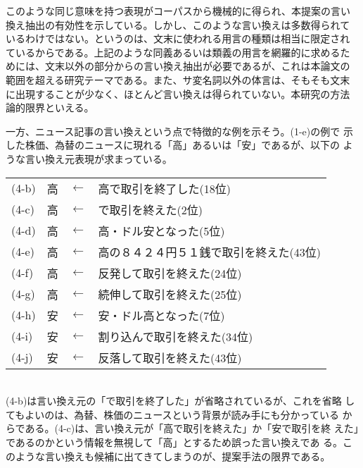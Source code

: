 \documentclass[jnlpbbl]{jnlp_j}
\begin{document}
このような同じ意味を持つ表現がコーパスから機械的に得られ、本提案の言い
換え抽出の有効性を示している。しかし、このような言い換えは多数得られて
いるわけではない。というのは、文末に使われる用言の種類は相当に限定され
ているからである。上記のような同義あるいは類義の用言を網羅的に求めるた
めには、文末以外の部分からの言い換え抽出が必要であるが、これは本論文の
範囲を超える研究テーマである。また、サ変名詞以外の体言は、そもそも文末
に出現することが少なく、ほとんど言い換えは得られていない。本研究の方法
論的限界といえる。

一方、ニュース記事の言い換えという点で特徴的な例を示そう。(1-e)の例で
示した株価、為替のニュースに現れる「高」あるいは「安」であるが、以下の
ような言い換え元表現が求まっている。
\\

\begin{tabular}{llcl}
(4-b) & 高  & $\leftarrow$ &  高で取引を終了した(18位) \\
(4-c) & 高  & $\leftarrow$ &  で取引を終えた(2位) \\
(4-d) & 高  & $\leftarrow$ &  高・ドル安となった(5位) \\ 
(4-e) & 高  & $\leftarrow$ &  高の８４２４円５１銭で取引を終えた(43位) \\
(4-f) & 高  & $\leftarrow$ &  反発して取引を終えた(24位) \\
(4-g) & 高  & $\leftarrow$ &  続伸して取引を終えた(25位) \\
(4-h) & 安  & $\leftarrow$ &   安・ドル高となった(7位) \\
(4-i) & 安  & $\leftarrow$ &   割り込んで取引を終えた(34位) \\
(4-j) & 安  & $\leftarrow$ &   反落して取引を終えた(43位)
\end{tabular}
\\

(4-b)は言い換え元の「で取引を終了した」が省略されているが、これを省略
してもよいのは、為替、株価のニュースという背景が読み手にも分かっている
からである。(4-c)は、言い換え元が「高で取引を終えた」か「安で取引を終
えた」であるのかという情報を無視して「高」とするため誤った言い換えであ
る。このような言い換えも候補に出てきてしまうのが、提案手法の限界である。
\end{document}
